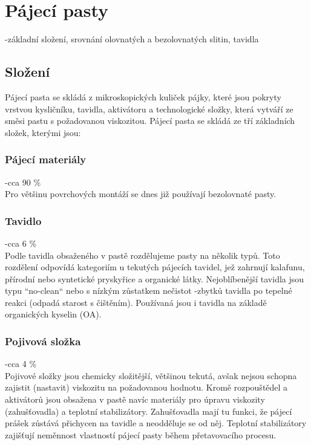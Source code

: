 \section{Pájecí pasty}
-základní složení, srovnání olovnatých a bezolovnatých slitin, tavidla

\subsection{Složení}
Pájecí pasta se skládá z mikroskopických kuliček pájky, které jsou pokryty vrstvou
kysličníku, tavidla, aktivátoru a technologické složky, která vytváří ze směsi pastu s
požadovanou viskozitou.
Pájecí pasta se skládá ze tří základních složek, kterými jsou:
\subsubsection{Pájecí materiály}
-cca 90 \%\\
Pro většinu povrchových montáží se dnes již používají bezolovnaté pasty.

\subsubsection{Tavidlo}
-cca 6 \%\\
Podle tavidla obsaženého v pastě rozdělujeme pasty na několik typů. Toto
rozdělení odpovídá kategoriím u tekutých pájecích tavidel, jež zahrnují kalafunu,
přírodní nebo syntetické pryskyřice a organické látky. Nejoblíbenější tavidla jsou
typu “no-clean“ nebo s nízkým zůstatkem nečistot -zbytků tavidla po tepelné reakci
(odpadá starost s čištěním). Používaná jsou i tavidla na základě organických
kyselin (OA).

\subsubsection{Pojivová složka}
-cca 4 \%\\
Pojivové složky jsou chemicky složitější, většinou tekutá, avšak nejsou schopna
zajistit (nastavit) viskozitu na požadovanou hodnotu. Kromě rozpouštědel a
aktivátorů jsou obsažena v pastě navíc materiály pro úpravu viskozity
(zahušťovadla) a teplotní stabilizátory. Zahušťovadla mají tu funkci, že pájecí
prášek zůstává přichycen na tavidle a neodděluje se od něj. Teplotní stabilizátory
zajišťují neměnnost vlastností pájecí pasty během přetavovacího procesu.

